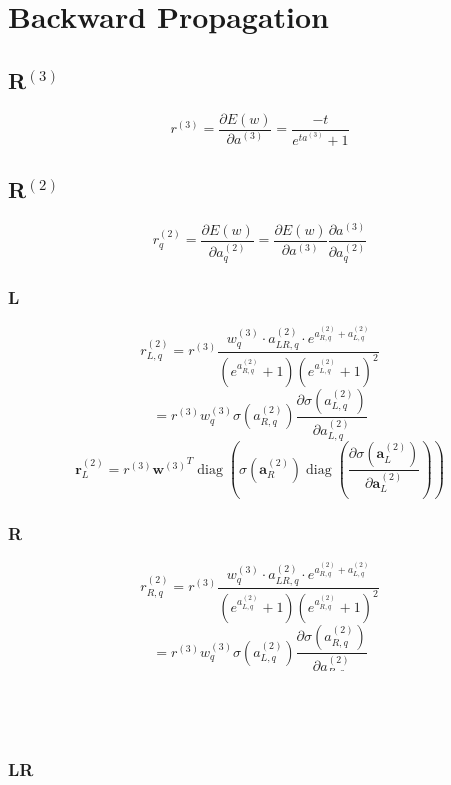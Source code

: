 \documentclass[11pt]{article}
\DeclareMathOperator*{\diag}{diag}
\begin{document}
\section*{Backward Propagation}
\subsection*{R$^{(3)}$}
$$r^{(3)}=\frac{\partial E(w)}{\partial a^{(3)}} = \frac{-t}{e^{ta^{(3)}}+1}$$

\subsection*{R$^{(2)}$}
$$ r^{(2)}_{q} = \frac{\partial E(w)}{\partial a^{(2)}_q} = \frac{\partial E(w)}{\partial a^{(3)}}\frac{\partial a^{(3)}}{\partial a^{(2)}_q}  $$
\subsubsection*{L}
$$r^{(2)}_{L, q} = r^{(3)} \frac{w^{(3)}_{q} \cdot a_{LR,q}^{(2)} \cdot e^{a_{R,q}^{(2)}+a_{L,q}^{(2)}}}{(e^{a_{R,q}^{(2)}}+1)(e^{a_{L,q}^{(2)}}+1)^2}$$
$$=r^{(3)} w^{(3)}_{q} \sigma (a_{R,q}^{(2)}) \frac{\partial \sigma (a_{L,q}^{(2)})}{\partial a_{L,q}^{(2)}}$$
$$\mathbf{r}_L^{(2)}={r}^{(3)} {\mathbf{w}^{(3)}}^T \diag (\sigma (\mathbf{a}_{R}^{(2)}) \diag (\frac{\partial \sigma (\mathbf{a}_{L}^{(2)})}{\partial \mathbf{a}_{L}^{(2)}}))$$

\subsubsection*{R}
$$r^{(2)}_{R, q} = r^{(3)} \frac{w^{(3)}_{q} \cdot a_{LR,q}^{(2)} \cdot e^{a_{R,q}^{(2)}+a_{L,q}^{(2)}}}{(e^{a_{L,q}^{(2)}}+1)(e^{a_{R,q}^{(2)}}+1)^2}$$
$$=r^{(3)} w^{(3)}_{q} \sigma (a_{L,q}^{(2)}) \frac{\partial \sigma (a_{R,q}^{(2)})}{\partial a_{R,q}^{(2)}}$$
$$\mathbf{r}_R^{(2)}={r}^{(3)} {\mathbf{w}^{(3)}}^T \diag (\sigma (\mathbf{a}_{L}^{(2)}) \diag (\frac{\partial \sigma (\mathbf{a}_{R}^{(2)})}{\partial \mathbf{a}_{R}^{(2)}}))$$

\subsubsection*{LR}
$$r^{(2)}_{LR,q} =r^{(3)} \frac{w^{(3)}_{q}}{(e^{-a_{L,q}^{(2)}}+1)(e^{-a_{R,q}^{(2)}}+1)}$$
$$=r^{(3)} w^{(3)}_{q} \sigma (a_{L,q}^{(2)}) \sigma (a_{R,q}^{(2)}) $$
$$\mathbf{r}^{(2)}_{LR} = r^{(3)} {\mathbf{w}^{(3)}}^T \diag ( \sigma (\mathbf{a}_{L}^{(2)}) \diag (\sigma (\mathbf{a}_{R}^{(2)}))) $$
\end{document}
